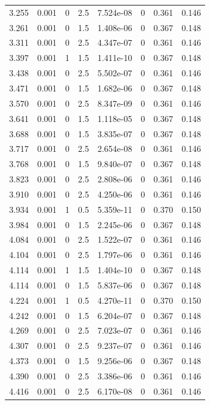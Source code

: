 \documentclass[preview]{standalone}
\begin{document}
{{{\begin{tabular}{L{1.2cm}C{1.2cm} C{0.3cm}C{0.5cm} C{1.4cm}C{1.4cm} C{1.4cm}C{1.4cm}}
  3.255  &  0.001  & 0     & 2.5 &  7.524e-08  & 0  & 0.361 &  0.146   \\ 
  3.261  &  0.001  & 0     & 1.5 &  1.408e-06  & 0  & 0.367 &  0.148   \\ 
  3.311  &  0.001  & 0     & 2.5 &  4.347e-07  & 0  & 0.361 &  0.146   \\ 
  3.397  &  0.001  & 1     & 1.5 &  1.411e-10  & 0  & 0.367 &  0.148   \\ 
  3.438  &  0.001  & 0     & 2.5 &  5.502e-07  & 0  & 0.361 &  0.146   \\ 
  3.471  &  0.001  & 0     & 1.5 &  1.682e-06  & 0  & 0.367 &  0.148   \\ 
  3.570  &  0.001  & 0     & 2.5 &  8.347e-09  & 0  & 0.361 &  0.146   \\ 
  3.641  &  0.001  & 0     & 1.5 &  1.118e-05  & 0  & 0.367 &  0.148   \\ 
  3.688  &  0.001  & 0     & 1.5 &  3.835e-07  & 0  & 0.367 &  0.148   \\ 
  3.717  &  0.001  & 0     & 2.5 &  2.654e-08  & 0  & 0.361 &  0.146   \\ 
  3.768  &  0.001  & 0     & 1.5 &  9.840e-07  & 0  & 0.367 &  0.148   \\ 
  3.823  &  0.001  & 0     & 2.5 &  2.808e-06  & 0  & 0.361 &  0.146   \\ 
  3.910  &  0.001  & 0     & 2.5 &  4.250e-06  & 0  & 0.361 &  0.146   \\ 
  3.934  &  0.001  & 1     & 0.5 &  5.359e-11  & 0  & 0.370 &  0.150   \\ 
  3.984  &  0.001  & 0     & 1.5 &  2.245e-06  & 0  & 0.367 &  0.148   \\ 
  4.084  &  0.001  & 0     & 2.5 &  1.522e-07  & 0  & 0.361 &  0.146   \\ 
  4.104  &  0.001  & 0     & 2.5 &  1.797e-06  & 0  & 0.361 &  0.146   \\ 
  4.114  &  0.001  & 1     & 1.5 &  1.404e-10  & 0  & 0.367 &  0.148   \\ 
  4.114  &  0.001  & 0     & 1.5 &  5.837e-06  & 0  & 0.367 &  0.148   \\ 
  4.224  &  0.001  & 1     & 0.5 &  4.270e-11  & 0  & 0.370 &  0.150   \\ 
  4.242  &  0.001  & 0     & 1.5 &  6.204e-07  & 0  & 0.367 &  0.148   \\ 
  4.269  &  0.001  & 0     & 2.5 &  7.023e-07  & 0  & 0.361 &  0.146   \\ 
  4.307  &  0.001  & 0     & 2.5 &  9.237e-07  & 0  & 0.361 &  0.146   \\ 
  4.373  &  0.001  & 0     & 1.5 &  9.256e-06  & 0  & 0.367 &  0.148   \\ 
  4.390  &  0.001  & 0     & 2.5 &  3.386e-06  & 0  & 0.361 &  0.146   \\ 
  4.416  &  0.001  & 0     & 2.5 &  6.170e-08  & 0  & 0.361 &  0.146   \\ 
\hline 
\end{tabular} 

}}}
\end{document}
